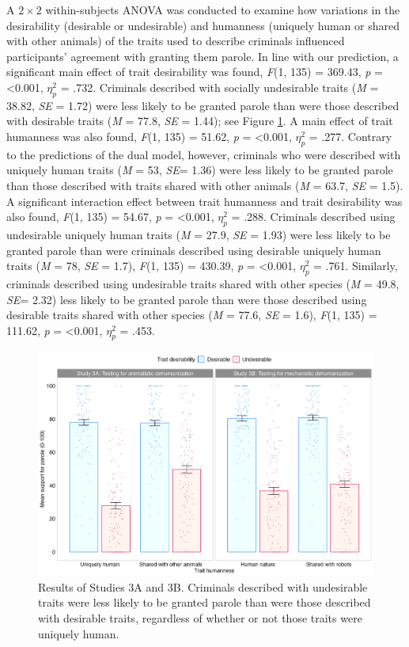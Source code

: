 \documentclass[
]{article}
\begin{document}
A \(2 \times 2\) within-subjects ANOVA was conducted to examine how variations in the desirability (desirable or undesirable) and humanness (uniquely human or shared with other animals) of the traits used to describe criminals influenced participants' agreement with granting them parole. In line with our prediction, a significant main effect of trait desirability was found, \emph{F}(1, 135) = 369.43, \emph{p} = \textless0.001, \(\eta_{p}^{2}\) = .732. Criminals described with socially undesirable traits (\emph{M} = 38.82, \emph{SE} = 1.72) were less likely to be granted parole than were those described with desirable traits (\emph{M} = 77.8, \emph{SE} = 1.44); see Figure \ref{fig:figure3}. A main effect of trait humanness was also found, \emph{F}(1, 135) = 51.62, \emph{p} = \textless0.001, \(\eta_{p}^{2}\) = .277. Contrary to the predictions of the dual model, however, criminals who were described with uniquely human traits (\emph{M} = 53, \emph{SE}= 1.36) were less likely to be granted parole than those described with traits shared with other animals (\emph{M} = 63.7, \emph{SE} = 1.5). A significant interaction effect between trait humanness and trait desirability was also found, \emph{F}(1, 135) = 54.67, \emph{p} = \textless0.001, \(\eta_{p}^{2}\) = .288. Criminals described using undesirable uniquely human traits (\emph{M} = 27.9, \emph{SE} = 1.93) were less likely to be granted parole than were criminals described using desirable uniquely human traits (\emph{M} = 78, \emph{SE} = 1.7), \emph{F}(1, 135) = 430.39, \emph{p} = \textless0.001, \(\eta_{p}^{2}\) = .761. Similarly, criminals described using undesirable traits shared with other species (\emph{M} = 49.8, \emph{SE}= 2.32) less likely to be granted parole than were those described using desirable traits shared with other species (\emph{M} = 77.6, \emph{SE} = 1.6), \emph{F}(1, 135) = 111.62, \emph{p} = \textless0.001, \(\eta_{p}^{2}\) = .453.

\begin{figure}

{\centering \includegraphics[width=0.9\linewidth]{figures/plot3} 

}

\caption{Results of Studies 3A and 3B.  Criminals described with undesirable traits were less likely to be granted parole than were those described with desirable traits, regardless of whether or not those traits were uniquely human.}\label{fig:figure3}
\end{figure}
\end{document}
